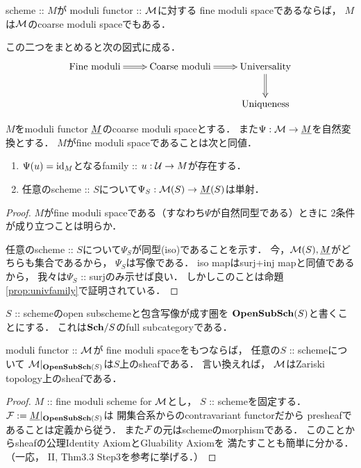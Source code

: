 \documentclass[a4paper]{jsarticle}
\begin{document}
    \begin{Prop}
        scheme :: $M$が
        moduli functor :: $\ftorM$に対する
        fine moduli spaceであるならば，
        $M$は$\ftorM$のcoarse moduli spaceでもある．
    \end{Prop}
    この二つをまとめると次の図式に成る．
    \[\xymatrix{
        \text{Fine moduli} \ar@{=>}[r]& \text{Coarse moduli} \ar@{=>}[r]& \text{Universality} \ar@{=>}[d]\\
        {} & {} & \text{Uniqueness}
    }\]

    \begin{Prop}
        $M$をmoduli functor $\ftor{M}$のcoarse moduli spaceとする．
        また$\Psi: \ftorM \to \ftor{M}$を自然変換とする．
        $M$がfine moduli spaceであることは次と同値．
        \begin{enumerate}
            \item $\Psi(u)=\id[M]$となるfamily :: $u: \famU \to M$が存在する．
            \item 任意のscheme :: $S$について$\Psi_S: \ftorM(S) \to \ftor{M}(S)$は単射．
        \end{enumerate}
    \end{Prop}
    \begin{proof}
        $M$がfine moduli spaceである（すなわち$\Psi$が自然同型である）ときに
        $2$条件が成り立つことは明らか．

        任意のscheme :: $S$について$\Psi_S$が同型(iso)であることを示す．
        今，$\ftorM(S), \ftor{M}$がどちらも集合であるから，
        $\Psi_S$は写像である．
        iso mapはsurj+inj mapと同値であるから，
        我々は$\Psi_S$ :: surjのみ示せば良い．
        しかしこのことは命題\ref{prop:univfamily}で証明されている．
    \end{proof}
    
    \begin{Prop}
        $S$ :: schemeのopen subschemeと包含写像が成す圏を
        $\OpenSubSch(S)$と書くことにする．
        これは$\Sch/S$のfull subcategoryである．

        moduli functor :: $\ftorM$が
        fine moduli spaceをもつならば，
        任意の$S$ :: schemeについて
        $\ftorM|_{\OpenSubSch(S)}$は$S$上のsheafである．
        言い換えれば，
        $\ftorM$はZariski topology上のsheafである．
    \end{Prop}
    \begin{proof}
        $M$ :: fine moduli scheme for $\ftorM$とし，
        $S$ :: schemeを固定する．
        $\shF:=\ftor{M}|_{\OpenSubSch(S)}$は
        開集合系からのcontravariant functorだから
        presheafであることは定義から従う．
        また$\shF$の元はschemeのmorphismである．
        このことからsheafの公理Identity AxiomとGluability Axiomを
        満たすことも簡単に分かる．
        （一応，\cite{HarAG} II, Thm3.3 Step3を参考に挙げる．）
    \end{proof}
\end{document}
